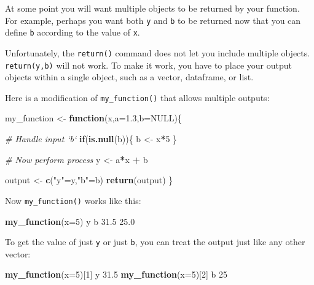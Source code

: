 \documentclass[
]{book}
\newenvironment{Shaded}{\begin{snugshade}}{\end{snugshade}}
\newcommand{\CommentTok}[1]{\textcolor[rgb]{0.56,0.35,0.01}{\textit{#1}}}
\newcommand{\ControlFlowTok}[1]{\textcolor[rgb]{0.13,0.29,0.53}{\textbf{#1}}}
\newcommand{\DataTypeTok}[1]{\textcolor[rgb]{0.13,0.29,0.53}{#1}}
\newcommand{\DecValTok}[1]{\textcolor[rgb]{0.00,0.00,0.81}{#1}}
\newcommand{\FloatTok}[1]{\textcolor[rgb]{0.00,0.00,0.81}{#1}}
\newcommand{\KeywordTok}[1]{\textcolor[rgb]{0.13,0.29,0.53}{\textbf{#1}}}
\newcommand{\NormalTok}[1]{#1}
\newcommand{\OperatorTok}[1]{\textcolor[rgb]{0.81,0.36,0.00}{\textbf{#1}}}
\newcommand{\OtherTok}[1]{\textcolor[rgb]{0.56,0.35,0.01}{#1}}
\newcommand{\StringTok}[1]{\textcolor[rgb]{0.31,0.60,0.02}{#1}}
\begin{document}
At some point you will want multiple objects to be returned by your function. For example, perhaps you want both \texttt{y} and \texttt{b} to be returned now that you can define \texttt{b} according to the value of \texttt{x}.

Unfortunately, the \texttt{return()} command does not let you include multiple objects. \texttt{return(y,b)} will not work. To make it work, you have to place your output objects within a single object, such as a vector, dataframe, or list.

Here is a modification of \texttt{my\_function()} that allows multiple outputs:

\begin{Shaded}
\begin{Highlighting}[]
\NormalTok{my_function <-}\StringTok{ }\ControlFlowTok{function}\NormalTok{(x,}\DataTypeTok{a=}\FloatTok{1.3}\NormalTok{,}\DataTypeTok{b=}\OtherTok{NULL}\NormalTok{)\{}
  
  \CommentTok{# Handle input `b`}
  \ControlFlowTok{if}\NormalTok{(}\KeywordTok{is.null}\NormalTok{(b))\{}
\NormalTok{    b <-}\StringTok{ }\NormalTok{x}\OperatorTok{*}\DecValTok{5}
\NormalTok{  \}}
  
  \CommentTok{# Now perform process}
\NormalTok{  y <-}\StringTok{ }\NormalTok{a}\OperatorTok{*}\NormalTok{x }\OperatorTok{+}\StringTok{ }\NormalTok{b}
  
\NormalTok{  output <-}\StringTok{ }\KeywordTok{c}\NormalTok{(}\StringTok{"y"}\NormalTok{=y,}\StringTok{"b"}\NormalTok{=b) }
  \KeywordTok{return}\NormalTok{(output)}
\NormalTok{\}}
\end{Highlighting}
\end{Shaded}

Now \texttt{my\_function()} works like this:

\begin{Shaded}
\begin{Highlighting}[]
\KeywordTok{my_function}\NormalTok{(}\DataTypeTok{x=}\DecValTok{5}\NormalTok{)}
\NormalTok{   y    b }
\FloatTok{31.5} \FloatTok{25.0} 
\end{Highlighting}
\end{Shaded}

To get the value of just \texttt{y} or just \texttt{b}, you can treat the output just like any other vector:

\begin{Shaded}
\begin{Highlighting}[]
\KeywordTok{my_function}\NormalTok{(}\DataTypeTok{x=}\DecValTok{5}\NormalTok{)[}\DecValTok{1}\NormalTok{]}
\NormalTok{   y }
\FloatTok{31.5} 
\KeywordTok{my_function}\NormalTok{(}\DataTypeTok{x=}\DecValTok{5}\NormalTok{)[}\DecValTok{2}\NormalTok{]}
\NormalTok{ b }
\DecValTok{25} 
\end{Highlighting}
\end{Shaded}
\end{document}
